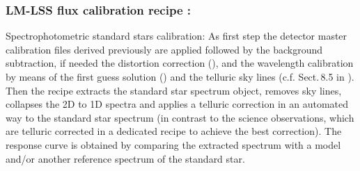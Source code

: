 %

\subsubsection{LM-LSS flux calibration recipe :}\label{rec:lsslmflux}
Spectrophotometric standard stars calibration: As first step the detector master calibration files derived previously are applied followed by the background subtraction, if needed the distortion correction (), and
the wavelength calibration by means of the first guess solution () and the telluric sky lines (c.f. Sect.\,8.5 in \cite{DRLS}). Then the recipe extracts the standard star spectrum object, removes sky lines, collapses the 2D to 1D spectra and applies a telluric correction in an automated way to the standard star spectrum (in contrast to the science observations, which are telluric corrected in a dedicated recipe to achieve the best correction). The response curve is obtained by comparing the extracted spectrum with a model and/or another reference spectrum of the
standard star.

